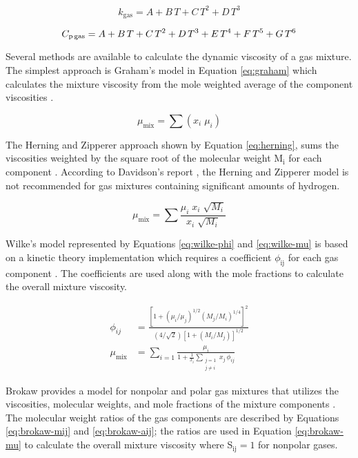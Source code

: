 \begin{equation}\label{eq:thermlcond}
    k_\text{gas} = A + B\,T + C\,T^2 + D\,T^3
\end{equation}

\begin{equation}\label{eq:heatcap}
    C_\text{p\,gas} = A + B\,T + C\,T^2 + D\,T^3 + E\,T^4 + F\,T^5 + G\,T^6
\end{equation}

Several methods are available to calculate the dynamic viscosity of a gas mixture. The simplest approach is Graham's model in Equation \ref{eq:graham} which calculates the mixture viscosity from the mole weighted average of the component viscosities \cite{Graham-1846}.

\begin{equation}
    \mu_\text{mix} = \sum(x_i \; \mu_i)
    \label{eq:graham}
\end{equation}

\noindent The Herning and Zipperer approach shown by Equation \ref{eq:herning}, sums the viscosities weighted by the square root of the molecular weight M$_\text{i}$ for each component \cite{Herning-1936}. According to Davidson's report \cite{Davidson-1993}, the Herning and Zipperer model is not recommended for gas mixtures containing significant amounts of hydrogen.

\begin{equation}
    \mu_\text{mix} = \sum \frac{\mu_i \; x_i \; \sqrt{M_i}}{x_i \; \sqrt{M_i}}
    \label{eq:herning}
\end{equation}

\noindent Wilke's model represented by Equations \ref{eq:wilke-phi} and \ref{eq:wilke-mu} is based on a kinetic theory implementation which requires a coefficient $\phi_\text{ij}$ for each gas component \cite{Wilke-1950}. The coefficients are used along with the mole fractions to calculate the overall mixture viscosity.

\begin{align}
    \phi_{ij} &= \frac{\left[1 + (\mu_i/\mu_j)^{1/2} (M_j/M_i)^{1/4}\right]^2}{(4/\sqrt{2}) \left[1 + (M_i/M_j)\right]^{1/2}} \label{eq:wilke-phi} \\
    \mu_{\text{mix}} &= \sum_{i=1} \frac{\mu_i}{1 + \frac{1}{x_i} \sum_{\substack{j=1 \\j \neq i}} x_j \, \phi_{ij}} \label{eq:wilke-mu}
\end{align}

\noindent Brokaw provides a model for nonpolar and polar gas mixtures that utilizes the viscosities, molecular weights, and mole fractions of the mixture components \cite{Brokaw-1968}. The molecular weight ratios of the gas components are described by Equations \ref{eq:brokaw-mij} and \ref{eq:brokaw-aij}; the ratios are used in Equation \ref{eq:brokaw-mu} to calculate the overall mixture viscosity where S$_\text{ij} = 1$ for nonpolar gases.

